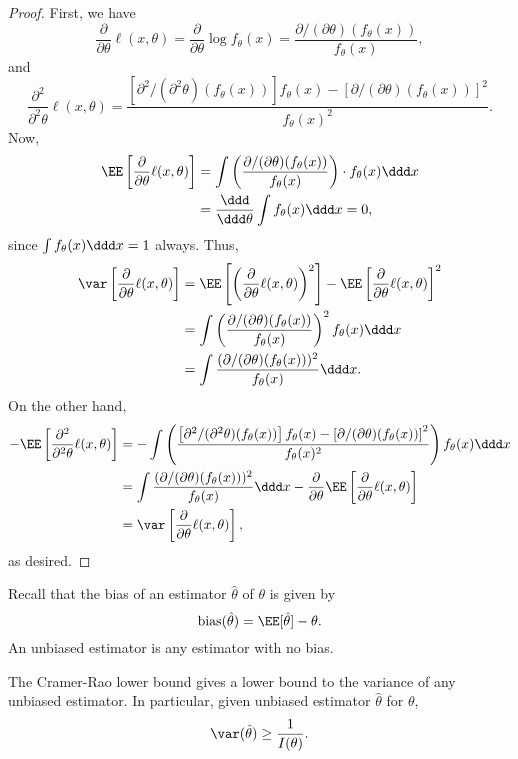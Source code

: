 \begin{proof}
First, we have 
\[\frac{\partial}{\partial \theta}\ell(x,\theta) = \frac{\partial}{\partial \theta}\log f_{\theta}(x) = \frac{\partial/(\partial \theta)(f_{\theta}(x))}{f_{\theta}(x)},\]
and 
\[\frac{\partial^2}{\partial^2 \theta}\ell(x,\theta) = \frac{\left[\partial^2/(\partial^2\theta)(f_{\theta}(x))\right]f_{\theta}(x) - \left[\partial/(\partial\theta)(f_{\theta}(x))\right]^2}{f_{\theta}(x)^2}.\]
Now,
\begin{align*}
\EE\left[\frac{\partial}{\partial \theta}\ell(x,\theta)\right]&=\int \left(\frac{\partial/(\partial \theta)(f_{\theta}(x))}{f_{\theta}(x)}\right)\cdot f_{\theta}(x)\ddd x \\
&= \frac{\ddd}{\ddd \theta}\int f_{\theta}(x) \ddd x = 0,
\end{align*}
since $\int f_{\theta}(x)\ddd x = 1$ always. Thus,
\begin{align*}
    \var\left[\frac{\partial}{\partial \theta}\ell(x,\theta)\right] &= \EE\left[\left(\frac{\partial}{\partial \theta}\ell(x,\theta)\right)^2\right] - \EE\left[\frac{\partial}{\partial \theta}\ell(x,\theta)\right]^2 \\
    &= \int \left(\frac{\partial/(\partial \theta)(f_{\theta}(x))}{f_{\theta}(x)}\right)^2f_{\theta}(x)\ddd x \\
    &= \int \frac{(\partial/(\partial \theta)(f_{\theta}(x)))^2}{f_{\theta}(x)} \ddd x.
\end{align*}
On the other hand, 
\begin{align*}
    -\EE\left[\frac{\partial^2}{\partial^2 \theta}\ell(x,\theta)\right] &= -\int \left(\frac{\left[\partial^2/(\partial^2\theta)(f_{\theta}(x))\right]f_{\theta}(x) - \left[\partial/(\partial\theta)(f_{\theta}(x))\right]^2}{f_{\theta}(x)^2}\right)f_{\theta}(x) \ddd x\\
    &= \int \frac{(\partial/(\partial \theta)(f_{\theta}(x)))^2}{f_{\theta}(x)} \ddd x - \frac{\partial}{\partial \theta}\EE\left[\frac{\partial}{\partial \theta}\ell(x,\theta)\right] \\
    &= \var\left[\frac{\partial}{\partial \theta}\ell(x,\theta)\right],
\end{align*}
as desired.
\end{proof}

Recall that the bias of an estimator $\hat{\theta}$ of $\theta$ is given by 
\[\text{bias}(\hat{\theta}) = \EE[\hat{\theta}] - \theta.\]
An unbiased estimator is any estimator with no bias.

\begin{definition}

The \ac{Cramer-Rao} lower bound gives a lower bound to the variance of any unbiased estimator. In particular, given unbiased estimator $\hat{\theta}$ for $\theta$, 
\[\var(\hat{\theta})\geq \frac{1}{I(\theta)}.\]
\end{definition}

